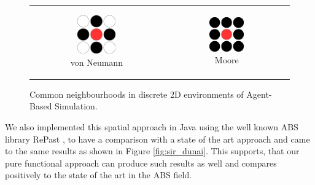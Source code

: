 \begin{figure}
\begin{center}
	\begin{tabular}{c c}
		\begin{subfigure}[b]{0.2\textwidth}
			\centering
			\includegraphics[width=0.5\textwidth, angle=0]{./fig/diagrams/neumann.png}
			\caption{von Neumann}
			\label{fig:neumann_neighbourhood}
		\end{subfigure}
    	&
		\begin{subfigure}[b]{0.2\textwidth}
			\centering
			\includegraphics[width=0.5\textwidth, angle=0]{./fig/diagrams/moore.png}
			\caption{Moore}
			\label{fig:moore_neighbourhood}
		\end{subfigure}
    \end{tabular}
	\caption{Common neighbourhoods in discrete 2D environments of Agent-Based Simulation.}
	\label{fig:abs_neighbourhoods}
\end{center}
\end{figure}

We also implemented this spatial approach in Java using the well known ABS library RePast \cite{north_complex_2013}, to have a comparison with a state of the art approach and came to the same results as shown in Figure \ref{fig:sir_dunai}. This supports, that our pure functional approach can produce such results as well and compares positively to the state of the art in the ABS field.

